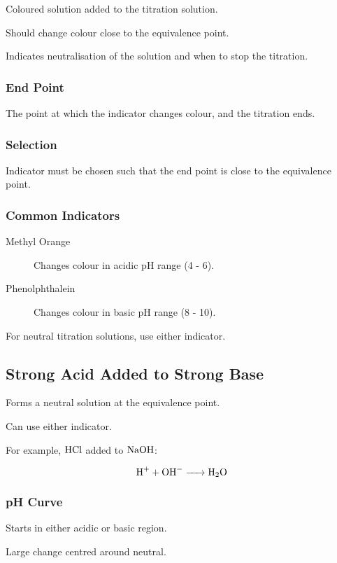 \documentclass[a4paper,11pt]{article}
\begin{document}
Coloured solution added to the titration solution.

Should change colour close to the equivalence point.

Indicates neutralisation of the solution and when to stop the titration.


\subsubsection{End Point}

The point at which the indicator changes colour, and the titration ends.


\subsubsection{Selection}

Indicator must be chosen such that the end point is close to the equivalence
point.


\subsubsection{Common Indicators}

\begin{description}
\item [Methyl Orange] Changes colour in acidic pH range (4 - 6).
\item [Phenolphthalein] Changes colour in basic pH range (8 - 10).
\end{description}

For neutral titration solutions, use either indicator.


\subsection{Strong Acid Added to Strong Base}

Forms a neutral solution at the equivalence point.

Can use either indicator.

For example, $\ce{HCl}$ added to $\ce{NaOH}$:

$$
\ce{H+ + OH- -> H2O}
$$


\subsubsection{pH Curve}

Starts in either acidic or basic region.

Large change centred around neutral.
\end{document}
